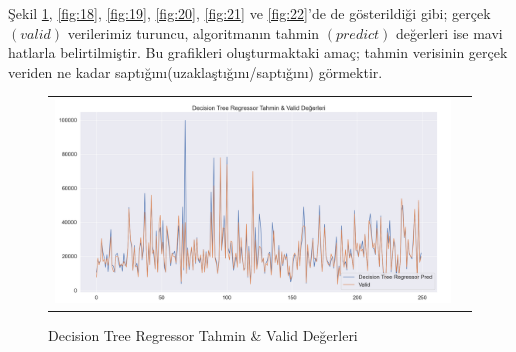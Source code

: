 \documentclass[conference]{IEEEtran}
\begin{document}
\quad Şekil \ref{fig:17}, \ref{fig:18}, \ref{fig:19}, \ref{fig:20}, \ref{fig:21} ve \ref{fig:22}'de de gösterildiği gibi; gerçek $(valid)$ verilerimiz turuncu, algoritmanın tahmin $(predict)$ değerleri ise mavi hatlarla belirtilmiştir. Bu grafikleri oluşturmaktaki amaç; tahmin verisinin gerçek veriden ne kadar saptığını(uzaklaştığını/saptığını) görmektir.
\begin{figure}[!h]
	\centering
	\begin{center}
		\begin{tabular}{cc}
			\includegraphics[scale=0.2]{pictures/pic_17.png}&
		\end{tabular}
	\end{center}
	\caption{Decision Tree Regressor Tahmin \& Valid Değerleri}
	\label{fig:17}
\end{figure}
\end{document}
